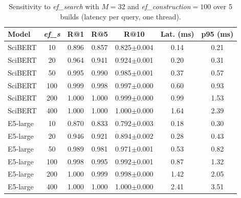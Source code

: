 \begin{table}[tbp]
\caption{Sensitivity to \textit{ef\_search} with $M=32$ and \textit{ef\_construction}$=100$ over 5 builds (latency per query, one thread).}\label{tab:efsearch}
\centering
\small
\begin{tabular}{|l|c|c|c|c|c|c|}
\hline
\textbf{Model} & \textbf{\textit{ef\_s}} & \textbf{R@1} & \textbf{R@5} & \textbf{R@10} & \textbf{Lat. (ms)} & \textbf{p95 (ms)} \\
\hline
SciBERT & 10 & 0.896 & 0.857 & 0.825$\pm$0.004 & 0.14 & 0.21 \\
SciBERT & 20 & 0.964 & 0.941 & 0.924$\pm$0.001 & 0.20 & 0.31 \\
SciBERT & 50 & 0.995 & 0.990 & 0.985$\pm$0.001 & 0.37 & 0.57 \\
SciBERT & 100 & 0.999 & 0.998 & 0.997$\pm$0.000 & 0.60 & 0.93 \\
SciBERT & 200 & 1.000 & 1.000 & 0.999$\pm$0.000 & 0.99 & 1.53 \\
SciBERT & 400 & 1.000 & 1.000 & 1.000$\pm$0.000 & 1.64 & 2.39 \\
E5-large & 10 & 0.870 & 0.833 & 0.792$\pm$0.003 & 0.18 & 0.30 \\
E5-large & 20 & 0.946 & 0.921 & 0.894$\pm$0.002 & 0.28 & 0.43 \\
E5-large & 50 & 0.989 & 0.981 & 0.971$\pm$0.001 & 0.53 & 0.82 \\
E5-large & 100 & 0.998 & 0.995 & 0.992$\pm$0.001 & 0.87 & 1.32 \\
E5-large & 200 & 1.000 & 0.999 & 0.998$\pm$0.000 & 1.42 & 2.05 \\
E5-large & 400 & 1.000 & 1.000 & 1.000$\pm$0.000 & 2.41 & 3.51 \\
\hline
\end{tabular}
\end{table}